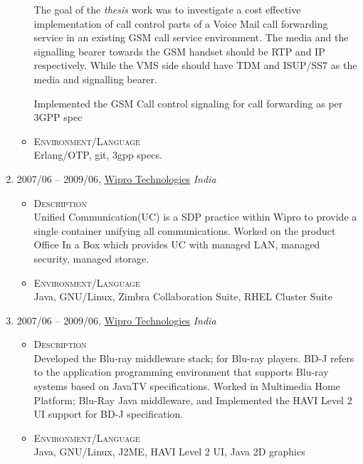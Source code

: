 \documentclass[a4paper,10pt]{article}
\begin{document}
\begin{enumerate}
\begin{itemize}
  The goal of the \emph{thesis} work was to investigate a cost effective implementation of call control parts of a Voice Mail call forwarding service in an existing GSM call service environment. The media and the signalling bearer towards the GSM handset should be RTP and IP respectively. While the VMS side should have TDM and ISUP/SS7 as the media and signalling bearer.

  Implemented the GSM Call control signaling for call forwarding as per 3GPP spec

  \item \textsc{Environment/Language} \\
  Erlang/OTP, git, 3gpp specs.

   \end{itemize}

\item \textsc{2007/06} – \textsc{2009/06}, \href{www.wipro.com}{Wipro Technologies} \emph {India} \\
  \begin{itemize}
    \item \textsc{Description} \\

      Unified Communication(UC) is a SDP practice within Wipro to provide a single container unifying all communications.
      Worked on the product Office In a Box which provides UC with managed LAN, managed security, managed storage.

    \item \textsc{Environment/Language} \\  
      Java, GNU/Linux, Zimbra Collaboration Suite, RHEL Cluster Suite

  \end{itemize}

\item \textsc{2007/06} – \textsc{2009/06}, \href{www.wipro.com}{Wipro Technologies} \emph {India} \\

  \begin{itemize}
    \item \textsc{Description} \\
      Developed the Blu-ray middleware stack; for Blu-ray players. BD-J refers to the application programming environment that supports Blu-ray systems based on JavaTV specifications. Worked in Multimedia Home Platform; Blu-Ray Java middleware, and Implemented the HAVI Level 2 UI support for BD-J specification.

    \item \textsc{Environment/Language} \\  
      Java, GNU/Linux, J2ME, HAVI Level 2 UI, Java 2D graphics


\end{itemize}
\end{enumerate}
\end{document}
